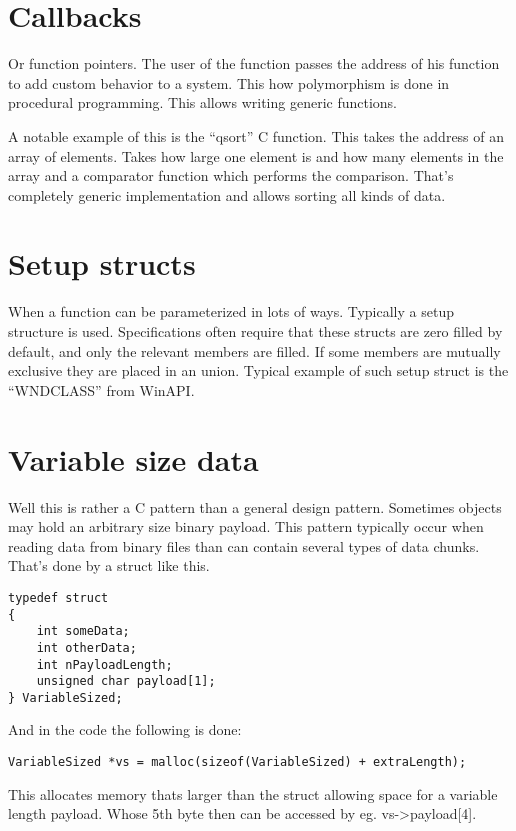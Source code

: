 \documentclass{book}
\begin{document}
\chapter{Callbacks}

Or function pointers. The user of the function passes the address of his function to add custom behavior to a system. This how polymorphism is done in procedural programming. 
This allows writing generic functions.

A notable example of this is the ``qsort'' C function. This takes the address of an array of elements. 
Takes how large one element is and how many elements in the array and a comparator function which performs the comparison. That's completely generic implementation and allows sorting all kinds of data.

\chapter{Setup structs}

When a function can be parameterized in lots of ways. Typically a setup structure is used. 
Specifications often require that these structs are zero filled by default, and only the relevant members are filled. 
If some members are mutually exclusive they are placed in an union. Typical example of such setup struct is the ``WNDCLASS'' from WinAPI.

\chapter{Variable size data}

Well this is rather a C pattern than a general design pattern. Sometimes objects may hold an arbitrary size binary payload. 
This pattern typically occur when reading data from binary files than can contain several types of data chunks. That's done by a struct like this.
\begin{lstlisting}
typedef struct
{
    int someData;
    int otherData;
    int nPayloadLength;
    unsigned char payload[1];
} VariableSized;
\end{lstlisting}

And in the code the following is done:
\begin{lstlisting}
VariableSized *vs = malloc(sizeof(VariableSized) + extraLength);
\end{lstlisting}

This allocates memory thats larger than the struct allowing space for a variable length payload. Whose 5th byte then can be accessed by eg. vs->payload[4].
\end{document}
